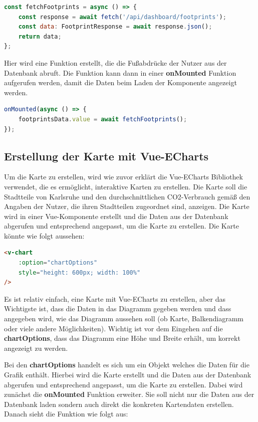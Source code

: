 \begin{lstlisting}[language={JavaScript}, caption={Laden der Fußabdrücke der Nutzer}]
const fetchFootprints = async () => {
    const response = await fetch('/api/dashboard/footprints');
    const data: FootprintResponse = await response.json();
    return data;
};
\end{lstlisting}

Hier wird eine Funktion erstellt, die die Fußabdrücke der Nutzer aus der Datenbank abruft. Die Funktion kann dann in einer \textbf{onMounted} Funktion aufgerufen werden, damit die Daten beim Laden der Komponente angezeigt werden.

\begin{lstlisting}[language={JavaScript}, caption={Bei laden der Komponente die Fußabdrücke der Nutzer speichern}]
onMounted(async () => {
    footprintsData.value = await fetchFootprints();
});
\end{lstlisting}

\subsection{Erstellung der Karte mit Vue-ECharts}

Um die Karte zu erstellen, wird wie zuvor erklärt die Vue-ECharts Bibliothek verwendet, die es ermöglicht, interaktive Karten zu erstellen. Die Karte soll die Stadtteile von Karlsruhe und den durchschnittlichen CO2-Verbrauch gemäß den Angaben der Nutzer, die ihren Stadtteilen zugeordnet sind, anzeigen. Die Karte wird in einer Vue-Komponente erstellt und die Daten aus der Datenbank abgerufen und entsprechend angepasst, um die Karte zu erstellen. Die Karte könnte wie folgt aussehen:

\begin{lstlisting}[language={html}, caption={Vue-ECharts Diagramm Beispiel}]
<v-chart
    :option="chartOptions"
    style="height: 600px; width: 100%"
/>
\end{lstlisting}

Es ist relativ einfach, eine Karte mit Vue-ECharts zu erstellen, aber das Wichtigste ist, dass die Daten in das Diagramm gegeben werden und dass angegeben wird, wie das Diagramm aussehen soll (ob Karte, Balkendiagramm oder viele andere Möglichkeiten). Wichtig ist vor dem Eingehen auf die \textbf{chartOptions}, dass das Diagramm eine Höhe und Breite erhält, um korrekt angezeigt zu werden.

Bei den \textbf{chartOptions} handelt es sich um ein Objekt welches die Daten für die Grafik enthält. Hierbei wird die Karte erstellt und die Daten aus der Datenbank abgerufen und entsprechend angepasst, um die Karte zu erstellen. Dabei wird zunächst die \textbf{onMounted} Funktion erweiter. Sie soll nicht nur die Daten aus der Datenbank laden sondern auch direkt die konkreten Kartendaten erstellen. Danach sieht die Funktion wie folgt aus:

